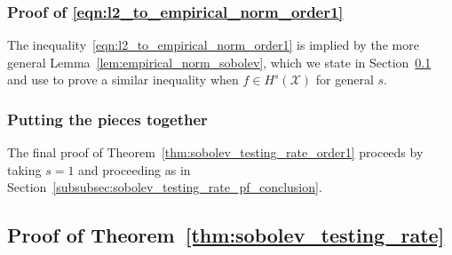 \documentclass{article}
\newcommand{\1}{\mathbf{1}}
\newcommand{\Xset}{\mathcal{X}}
\theoremstyle{alden}
\theoremstyle{aldenthm}
\theoremstyle{definition}
\theoremstyle{remark}
\begin{document}
\subsubsection{Proof of \eqref{eqn:l2_to_empirical_norm_order1}}
The inequality~\eqref{eqn:l2_to_empirical_norm_order1} is implied by the more general Lemma~\ref{lem:empirical_norm_sobolev}, which we state in Section~\ref{subsec:sobolev_testing_rate_pf} and use to prove a similar inequality when $f \in H^s(\Xset)$ for general $s$. 

\subsubsection{Putting the pieces together}

The final proof of Theorem~\ref{thm:sobolev_testing_rate_order1} proceeds by taking $s = 1$ and proceeding as in Section~\ref{subsubsec:sobolev_testing_rate_pf_conclusion}.


\subsection{Proof of Theorem~\ref{thm:sobolev_testing_rate}}
\label{subsec:sobolev_testing_rate_pf}
\end{document}
